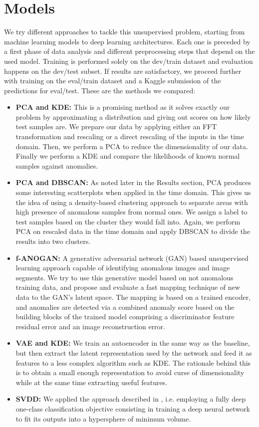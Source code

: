 \documentclass{article}
\begin{document}
\section{Models}
We try different approaches to tackle this unsupervised problem, starting from machine learning models to deep learning architectures. Each one is preceded by a first phase of data analysis and different preprocessing steps that depend on the used model. Training is performed solely on the dev/train dataset and evaluation happens on the dev/test subset. If results are satisfactory, we proceed further with training on the eval/train dataset and a Kaggle submission of the predictions for eval/test. These are the methods we compared:
\begin{itemize}
	\item \textbf{PCA and KDE:} This is a promising method as it solves exactly our problem by approximating a distribution and giving out scores on how likely test samples are. We prepare our data by applying either an FFT transformation and rescaling or a direct rescaling of the inputs in the time domain. Then, we perform a PCA to reduce the dimensionality of our data. Finally we perform a KDE and compare the likelihoods of known normal samples against anomalies.  
	\item \textbf{PCA and DBSCAN:} As noted later in the Results section, PCA produces some interesting scatterplots when applied in the time domain. This gives us the idea of using a density-based clustering approach to separate areas with high presence of anomalous samples from normal ones. We assign a label to test samples based on the cluster they would fall into. Again, we perform PCA on rescaled data in the time domain and apply DBSCAN to divide the results into two clusters.
	\item \textbf{f-ANOGAN:}\cite{fANOGAN} A generative adversarial network (GAN) based unsupervised learning approach capable of identifying anomalous images and image segments. We try to use this generative model based on not anomalous training data, and propose and evaluate a fast mapping technique of new data to the GAN's latent space. The mapping is based on a trained encoder, and anomalies are detected via a combined anomaly score based on the building blocks of the trained model comprising a discriminator feature residual error and an image reconstruction error. 
	\item \textbf{VAE and KDE:} We train an autoencoder in the same way as the baseline, but then extract the latent representation used by the network and feed it as features to a less complex algorithm such as KDE. The rationale behind this is to obtain a small enough representation to avoid curse of dimensionality while at the same time extracting useful features. 
	\item  \textbf{SVDD:} We applied the approach described in \cite{ruff18a}, i.e. employing a fully deep one-class classification objective consisting in training a deep neural network to fit its outputs into a hypersphere of minimum volume. 
	

\end{itemize}
\end{document}
